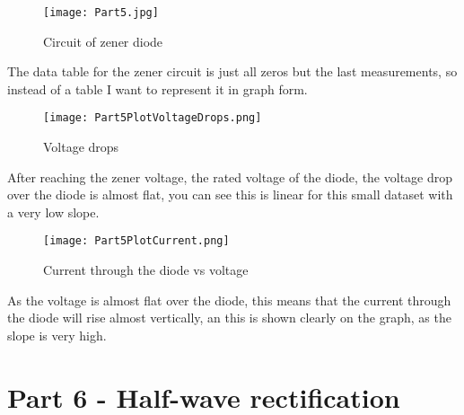 \documentclass{article}
\begin{document}

\begin{figure}[h] %
\centering
\texttt{[image: Part5.jpg]}
\caption{Circuit of zener diode}
\label{fig:part5}
\end{figure}

The data table for the zener circuit is just all zeros but the last measurements, so instead of a table I want to represent it in graph form.

\clearpage


\begin{figure}[h] %
\centering
\texttt{[image: Part5PlotVoltageDrops.png]}
\caption{Voltage drops}
\label{fig:part5voltage}
\end{figure}

After reaching the zener voltage, the rated voltage of the diode, the voltage drop over the diode is almost flat, you can see this is linear for this small dataset with a very low slope.

\clearpage


\begin{figure}[h] %
\centering
\texttt{[image: Part5PlotCurrent.png]}
\caption{Current through the diode vs voltage}
\label{fig:part5current}
\end{figure}

As the voltage is almost flat over the diode, this means that the current through the diode will rise almost vertically, an this is shown clearly on the graph, as the slope is very high.



\section{Part 6 - Half-wave rectification}

\end{document}
